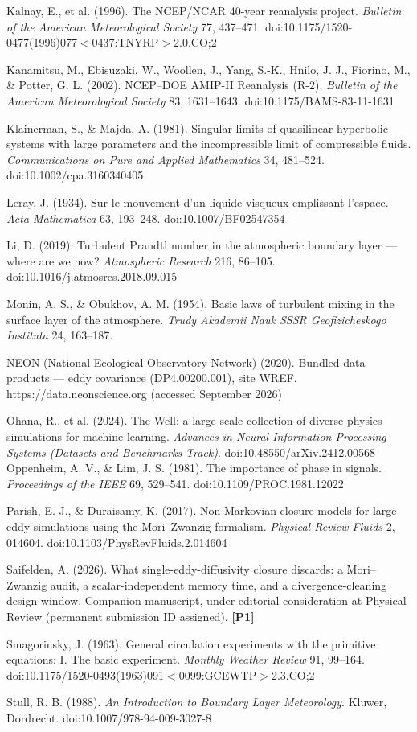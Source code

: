 \documentclass[aps,prfluids,preprint,superscriptaddress,nofootinbib]{revtex4-2}
\begin{document}
Kalnay, E., et al. (1996). The NCEP/NCAR 40-year reanalysis project. \emph{Bulletin of the American Meteorological Society} 77, 437--471. doi:10.1175/\hspace{0pt}1520-0477(1996)077$<$0437:TNYRP$>$2.0.CO;2

Kanamitsu, M., Ebisuzaki, W., Woollen, J., Yang, S.-K., Hnilo, J. J., Fiorino, M., \& Potter, G. L. (2002). NCEP--DOE AMIP-II Reanalysis (R-2). \emph{Bulletin of the American Meteorological Society} 83, 1631--1643. doi:10.1175/BAMS-83-11-1631

Klainerman, S., \& Majda, A. (1981). Singular limits of quasilinear hyperbolic systems with large parameters and the incompressible limit of compressible fluids. \emph{Communications on Pure and Applied Mathematics} 34, 481--524. doi:10.1002/cpa.3160340405

Leray, J. (1934). Sur le mouvement d'un liquide visqueux emplissant l'espace. \emph{Acta Mathematica} 63, 193--248. doi:10.1007/\hspace{0pt}BF02547354

Li, D. (2019). Turbulent Prandtl number in the atmospheric boundary layer --- where are we now? \emph{Atmospheric Research} 216, 86--105. doi:10.1016/j.atmosres.2018.09.015

Monin, A. S., \& Obukhov, A. M. (1954). Basic laws of turbulent mixing in the surface layer of the atmosphere. \emph{Trudy Akademii Nauk SSSR Geofizicheskogo Instituta} 24, 163--187.

NEON (National Ecological Observatory Network) (2020). Bundled data products --- eddy covariance (DP4.00200.001), site WREF. https://data.neonscience.org (accessed September 2026)

Ohana, R., et al. (2024). The Well: a large-scale collection of diverse physics simulations for machine learning. \emph{Advances in Neural Information Processing Systems (Datasets and Benchmarks Track)}. doi:10.48550/arXiv.2412.00568
Oppenheim, A. V., \& Lim, J. S. (1981). The importance of phase in signals. \emph{Proceedings of the IEEE} 69, 529--541. doi:10.1109/PROC.1981.12022

Parish, E. J., \& Duraisamy, K. (2017). Non-Markovian closure models for large eddy simulations using the Mori--Zwanzig formalism. \emph{Physical Review Fluids} 2, 014604. doi:10.1103/\hspace{0pt}PhysRevFluids.2.014604

Saifelden, A. (2026). What single-eddy-diffusivity closure discards: a Mori--Zwanzig audit, a scalar-independent memory time, and a divergence-cleaning design window. Companion manuscript, under editorial consideration at Physical Review (permanent submission ID assigned). \textbf{[P1]}

Smagorinsky, J. (1963). General circulation experiments with the primitive equations: I. The basic experiment. \emph{Monthly Weather Review} 91, 99--164. doi:10.1175/\hspace{0pt}1520-0493(1963)091$<$0099:GCEWTP$>$2.3.CO;2

Stull, R. B. (1988). \emph{An Introduction to Boundary Layer Meteorology}. Kluwer, Dordrecht. doi:10.1007/\hspace{0pt}978-94-009-3027-8
\endgroup
\end{document}
